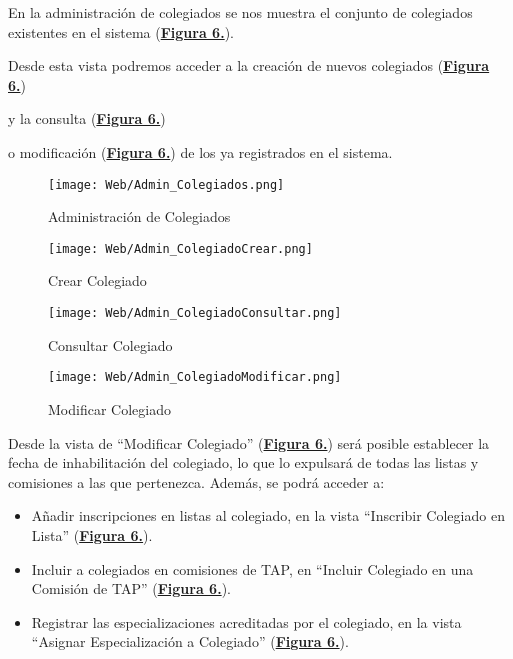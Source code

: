 \addtocounter{figura_manual}{1} En la administración de colegiados se nos muestra el conjunto de colegiados existentes en el sistema (\textbf{\hyperref[fig:Web_Admin_Colegiados]{Figura 6.}}).\addtocounter{figura_manual}{1}  Desde esta vista podremos acceder a la creación de nuevos colegiados (\textbf{\hyperref[fig:Web_Admin_ColegiadoCrear]{Figura 6.}}) \addtocounter{figura_manual}{1} y la consulta (\textbf{\hyperref[fig:Web_Admin_ColegiadoConsultar]{Figura 6.}})\addtocounter{figura_manual}{1}  o modificación (\textbf{\hyperref[fig:Web_Admin_ColegiadoModificar]{Figura 6.}}) de los ya registrados en el sistema.
\begin{figure}[!htbp]
  \centering
  \texttt{[image: Web/Admin\_Colegiados.png]}
  \caption{Administración de Colegiados}
  \label{fig:Web_Admin_Colegiados}
\end{figure}
\FloatBarrier

\begin{figure}[!htbp]
  \centering
  \texttt{[image: Web/Admin\_ColegiadoCrear.png]}
  \caption{Crear Colegiado}
  \label{fig:Web_Admin_ColegiadoCrear}
\end{figure}
\FloatBarrier

\begin{figure}[!htbp]
  \centering
  \texttt{[image: Web/Admin\_ColegiadoConsultar.png]}
  \caption{Consultar Colegiado}
  \label{fig:Web_Admin_ColegiadoConsultar}
\end{figure}
\FloatBarrier

\begin{figure}[!htbp]
  \centering
  \texttt{[image: Web/Admin\_ColegiadoModificar.png]}
  \caption{Modificar Colegiado}
  \label{fig:Web_Admin_ColegiadoModificar}
\end{figure}
\FloatBarrier

Desde la vista de ``Modificar Colegiado'' (\textbf{\hyperref[fig:Web_Admin_ColegiadoModificar]{Figura 6.}}) será posible establecer la fecha de inhabilitación del colegiado, lo que lo expulsará de todas las listas y comisiones a las que pertenezca. Además, se podrá acceder a:
\begin{itemize}
  \item \addtocounter{figura_manual}{1} Añadir inscripciones en listas al colegiado, en la vista ``Inscribir Colegiado en Lista'' (\textbf{\hyperref[fig:Web_Admin_ColegiadoInscribirLista]{Figura 6.}}).
  \item \addtocounter{figura_manual}{1} Incluir a colegiados en comisiones de TAP, en ``Incluir Colegiado en una Comisión de TAP'' (\textbf{\hyperref[fig:Web_Admin_ColegiadoIncluirComision]{Figura 6.}}).
  \item \addtocounter{figura_manual}{1} Registrar las especializaciones acreditadas por el colegiado, en la vista ``Asignar Especialización a Colegiado'' (\textbf{\hyperref[fig:Web_Admin_ColegiadoAsignarEspecializacion]{Figura 6.}}).
\end{itemize}

